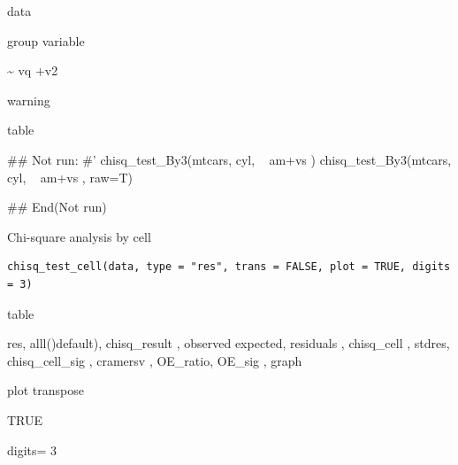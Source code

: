 \documentclass[a4paper]{book}
\begin{document}
%
\begin{Arguments}
\begin{ldescription}
\item[\code{data}] data

\item[\code{grp}] group variable

\item[\code{formula}] \textasciitilde{} vq +v2

\item[\code{raw}] warning
\end{ldescription}
\end{Arguments}
%
\begin{Value}
table
\end{Value}
%
\begin{Examples}
\begin{ExampleCode}

\#\# Not run: 
#'
chisq_test_By3(mtcars, cyl, ~ am+vs )
chisq_test_By3(mtcars, cyl, ~ am+vs , raw=T)


## End(Not run)
\end{ExampleCode}
\end{Examples}
%
\begin{Description}
Chi-square analysis by cell
\end{Description}
%
\begin{Usage}
\begin{verbatim}
chisq_test_cell(data, type = "res", trans = FALSE, plot = TRUE, digits = 3)
\end{verbatim}
\end{Usage}
%
\begin{Arguments}
\begin{ldescription}
\item[\code{data}] table

\item[\code{type}] res, alll()default), chisq\_result , observed   expected,   residuals ,  chisq\_cell ,  stdres, chisq\_cell\_sig ,  cramersv ,  OE\_ratio,    OE\_sig ,   graph

\item[\code{trans}] plot transpose

\item[\code{plot}] TRUE

\item[\code{digits}] digits= 3
\end{ldescription}
\end{Arguments}
\end{document}
